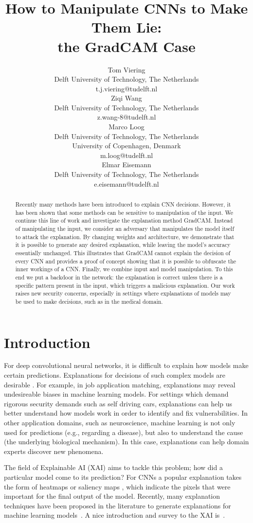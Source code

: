 \documentclass{article}
\title{How to Manipulate CNNs to Make Them Lie:\\the GradCAM Case}
\author{
  Tom Viering\\
  Delft University of Technology, The Netherlands\\
  t.j.viering@tudelft.nl\\
  \And
  Ziqi Wang\\
  Delft University of Technology, The Netherlands\\
  z.wang-8@tudelft.nl\\
  \And
  Marco Loog\\
  Delft University of Technology, The Netherlands\\
  University of Copenhagen, Denmark\\
  m.loog@tudelft.nl\\
  \And
  Elmar Eisemann\\
  Delft University of Technology, The Netherlands\\
  e.eisemann@tudelft.nl\\
}
\begin{document}
\maketitle

\begin{abstract}
Recently many methods have been introduced to explain CNN decisions. However, it has been shown that some methods can be sensitive to manipulation of the input. We continue this line of work and investigate the explanation method GradCAM. Instead of manipulating the input, we consider an adversary that manipulates the model itself to attack the explanation. By changing weights and architecture, we demonstrate that it is possible to generate any desired explanation, while leaving the model's accuracy essentially unchanged. This illustrates that GradCAM cannot explain the decision of every CNN and provides a proof of concept showing that it is possible to obfuscate the inner workings of a CNN. Finally, we combine input and model manipulation. To this end we put a backdoor in the network: the explanation is correct unless there is a specific pattern present in the input, which triggers a malicious explanation. Our work raises new security concerns, especially in settings where explanations of models may be used to make decisions, such as in the medical domain.
  \end{abstract}

\section{Introduction}

For deep convolutional neural networks, it is difficult to explain how models make certain predictions. Explanations for decisions of such complex models are desirable \citep{surveyXAI}. For example, in job application matching, explanations may reveal undesireable biases in machine learning models. For settings which demand rigorous security demands such as self driving cars, explanations can help us better understand how models work in order to identify and fix vulnerabilities. In other application domains, such as neuroscience, machine learning is not only used for predictions (e.g., regarding a disease), but also to understand the cause (the underlying biological mechanism). In this case, explanations can help domain experts discover new phenomena.

The field of Explainable AI (XAI) aims to tackle this problem; how did a particular model come to its prediction? For CNNs a popular explanation takes the form of heatmaps or saliency maps \citep{simplegrad}, which indicate the pixels that were important for the final output of the model. Recently, many explanation techniques have been proposed in the literature to generate explanations for machine learning models~\citep{SHAP,GradCAM,patternnet,AxiomaticAttribution,simplegrad,guidedbackprop,deconvnet_original,koh2017understanding,gradientTimesInput,bach2015pixel,smoothgrad,LIME,amogh_localization,Fong2017InterpretablePerturbation,Dabkowski2017RealClassifiers,Zintgraf2017VisualizingAnalysis,objectdetector}. A nice introduction and survey to the XAI is~\citep{surveyXAI}.
\end{document}
